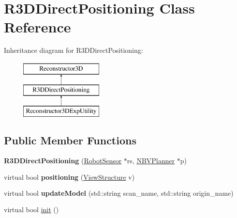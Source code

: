 \hypertarget{classR3DDirectPositioning}{}\section{R3\+D\+Direct\+Positioning Class Reference}
\label{classR3DDirectPositioning}
Inheritance diagram for R3\+D\+Direct\+Positioning\+:\begin{figure}[H]
\begin{center}
\leavevmode
\includegraphics[height=3.000000cm]{classR3DDirectPositioning}
\end{center}
\end{figure}
\subsection*{Public Member Functions}
\begin{DoxyCompactItemize}
\item 
{\bfseries R3\+D\+Direct\+Positioning} (\hyperlink{classRobotSensor}{Robot\+Sensor} $\ast$rs, \hyperlink{classNBVPlanner}{N\+B\+V\+Planner} $\ast$p)\hypertarget{classR3DDirectPositioning_a9f070cad93a8f6e814e8cd9eea43dffb}{}\label{classR3DDirectPositioning_a9f070cad93a8f6e814e8cd9eea43dffb}

\item 
virtual bool {\bfseries positioning} (\hyperlink{classViewStructure}{View\+Structure} v)\hypertarget{classR3DDirectPositioning_ac0d2abf3990d2af285c0e608b55d2843}{}\label{classR3DDirectPositioning_ac0d2abf3990d2af285c0e608b55d2843}

\item 
virtual bool {\bfseries update\+Model} (std\+::string scan\+\_\+name, std\+::string origin\+\_\+name)\hypertarget{classR3DDirectPositioning_a09b8d4ae2f3a3d1360590dac43fcc72e}{}\label{classR3DDirectPositioning_a09b8d4ae2f3a3d1360590dac43fcc72e}

\item 
virtual bool \hyperlink{classR3DDirectPositioning_a8688c3962bf886cf99cd04ff0b0ee7a9}{init} ()
\end{DoxyCompactItemize}
